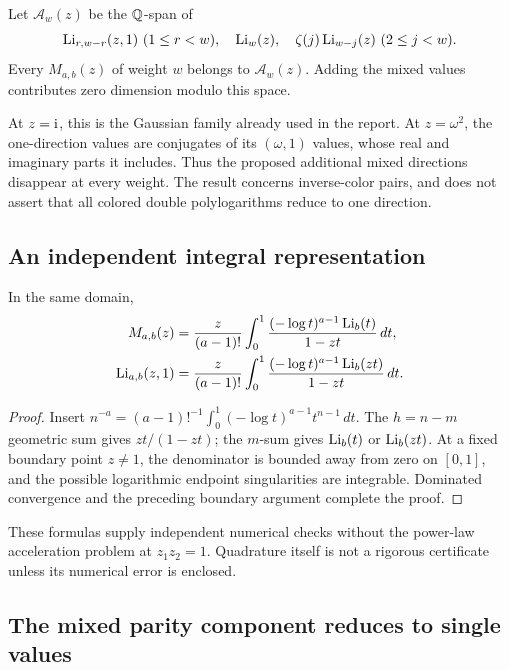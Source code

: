 \begin{corollary}\label{inverse:cor:mixedzero}
Let \(\mathcal A_w(z)\) be the \(\mathbb{Q}\)-span of
\[
\operatorname{Li}_{r,w-r}(z,1)\ (1\le r<w),\quad
\operatorname{Li}_w(z),\quad \zeta(j)\operatorname{Li}_{w-j}(z)\ (2\le j<w).
\]
Every \(M_{a,b}(z)\) of weight \(w\) belongs to \(\mathcal A_w(z)\).
Adding the mixed values contributes zero dimension modulo this space.
\end{corollary}

At \(z=\mathrm{i}\), this is the Gaussian family already used in the report.
At \(z=\omega^2\), the one-direction values are conjugates of its
\((\omega,1)\) values, whose real and imaginary parts it includes.
Thus the proposed additional mixed directions disappear at every
weight. The result concerns inverse-color pairs, and does not assert
that all colored double polylogarithms reduce to one direction.

\subsection{An independent integral representation}

\begin{proposition}\label{inverse:prop:mixedintegral}
In the same domain,
\begin{align}
M_{a,b}(z)&=\frac{z}{(a-1)!}\int_0^1
 \frac{(-\log t)^{a-1}\operatorname{Li}_b(t)}{1-zt}\,dt,
\label{inverse:eq:mixedintegral}\\
\operatorname{Li}_{a,b}(z,1)&=\frac{z}{(a-1)!}\int_0^1
 \frac{(-\log t)^{a-1}\operatorname{Li}_b(zt)}{1-zt}\,dt.
\label{inverse:eq:directionintegral}
\end{align}
\end{proposition}
\begin{proof}
Insert
\(n^{-a}=(a-1)!^{-1}\int_0^1(-\log t)^{a-1}t^{n-1}\,dt\).
The \(h=n-m\) geometric sum gives \(zt/(1-zt)\);
the \(m\)-sum gives \(\operatorname{Li}_b(t)\) or \(\operatorname{Li}_b(zt)\).
At a fixed boundary point \(z\ne1\), the denominator is bounded away
from zero on \([0,1]\), and the possible logarithmic endpoint
singularities are integrable. Dominated convergence and the preceding
boundary argument complete the proof.
\end{proof}

These formulas supply independent numerical checks without the
power-law acceleration problem at \(z_1z_2=1\). Quadrature itself is
not a rigorous certificate unless its numerical error is enclosed.

\subsection{The mixed parity component reduces to single values}

